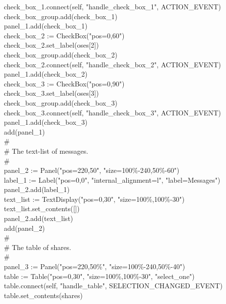 {\>\>check\_box\_1.connect(self, "handle\_check\_box\_1", ACTION\_EVENT) \\
\>\>check\_box\_group.add(check\_box\_1) \\
\>\>panel\_1.add(check\_box\_1) \\
\>\>check\_box\_2 := CheckBox("pos=0,60") \\
\>\>check\_box\_2.set\_label(oses[2]) \\
\>\>check\_box\_group.add(check\_box\_2) \\
\>\>check\_box\_2.connect(self, "handle\_check\_box\_2", ACTION\_EVENT) \\
\>\>panel\_1.add(check\_box\_2) \\
\>\>check\_box\_3 := CheckBox("pos=0,90") \\
\>\>check\_box\_3.set\_label(oses[3]) \\
\>\>check\_box\_group.add(check\_box\_3) \\
\>\>check\_box\_3.connect(self, "handle\_check\_box\_3", ACTION\_EVENT) \\
\>\>panel\_1.add(check\_box\_3) \\
\>\>add(panel\_1) \\
\>\>\# \\
\>\>\# The text-list of messages. \\
\>\>\# \\
\>\>panel\_2 := Panel("pos=220,50", "size=100\%-240,50\%-60") \\
\>\>label\_1 := Label("pos=0,0", "internal\_alignment=l", "label=Messages") \\
\>\>panel\_2.add(label\_1) \\
\>\>text\_list := TextDisplay("pos=0,30", "size=100\%,100\%-30") \\
\>\>text\_list.set\_contents([]) \\
\>\>panel\_2.add(text\_list) \\
\>\>add(panel\_2) \\
\>\>\# \\
\>\>\# The table of shares. \\
\>\>\# \\
\>\>panel\_3 := Panel("pos=220,50\%", "size=100\%-240,50\%-40") \\
\>\>table := Table("pos=0,30", "size=100\%,100\%-30", "select\_one") \\
\>\>table.connect(self, "handle\_table", SELECTION\_CHANGED\_EVENT) \\
\>\>table.set\_contents(shares) \\
\ \\
}
